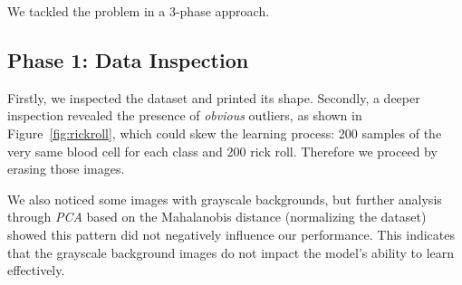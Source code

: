 \documentclass[11pt]{article}
\begin{document}
\begin{multicols*}{2}
        We tackled the problem in a 3-phase approach.

        \subsection{Phase 1: Data Inspection}

        Firstly, we inspected the dataset and printed its shape. Secondly, a deeper inspection revealed the presence of \textit{obvious} outliers, as shown in Figure~\ref{fig:rickroll}, which could skew the learning process: 200 samples of the very same blood cell for each class and 200 rick roll. Therefore we proceed by erasing those images.

        We also noticed some images with grayscale backgrounds, but further analysis through \textit{PCA} based on the Mahalanobis distance \cite{outliers} (normalizing the dataset) showed this pattern did not negatively influence our performance. This indicates that the grayscale background images do not impact the model's ability to learn effectively. 



\end{multicols*}
\end{document}
